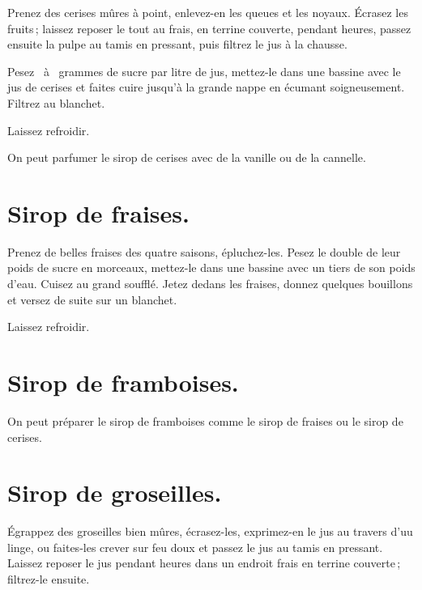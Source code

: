 Prenez des cerises mûres à point, enlevez-en les queues et les noyaux. Écrasez
les fruits ; laissez reposer le tout au frais, en terrine couverte, pendant
{\mmm} heures, passez ensuite la pulpe au tamis en pressant, puis filtrez
le jus à la chausse.

Pesez {\mmm} {\mmm} à {\mmm} {\mmm} grammes de sucre
par litre de jus, mettez-le dans une bassine avec le jus de cerises et faites
cuire jusqu'à la grande nappe en écumant soigneusement. Filtrez au blanchet.

Laissez refroidir.

\medskip

On peut parfumer le sirop de cerises avec de la vanille ou de la cannelle.

\section*{\centering Sirop de fraises.}
{}

Prenez de belles fraises des quatre saisons, épluchez-les. Pesez le double de
leur poids de sucre en morceaux, mettez-le dans une bassine avec un tiers de
son poids d'eau. Cuisez au grand soufflé. Jetez dedans les fraises, donnez
quelques bouillons et versez de suite sur un blanchet.

Laissez refroidir.

\section*{\centering Sirop de framboises.}
{}

On peut préparer le sirop de framboises comme le sirop de fraises ou le sirop de
cerises.

\section*{\centering Sirop de groseilles.}
{}

Égrappez des groseilles bien mûres, écrasez-les, exprimez-en le jus au travers
d'uu linge, ou faites-les crever sur feu doux et passez le jus au tamis en
pressant. Laissez reposer le jus pendant {\mmm} heures dans un endroit
frais en terrine couverte ; filtrez-le ensuite.

